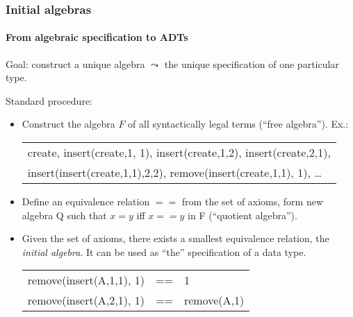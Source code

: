 \documentclass{beamer}
\begin{document}
\begin{frame}[fragile]
\frametitle{Initial algebras}
\framesubtitle{From algebraic specification to ADTs}
Goal: construct a unique algebra $\leadsto$ the unique specification of
one particular type.
\bigskip

Standard procedure:
\begin{itemize}
\item Construct the algebra $F$ of all  syntactically legal terms 
(``free algebra''). Ex.:
\\
\hspace*{0.5cm}
{\small\em
\begin{tabular}{l}
create, insert(create,1, 1), 
insert(create,1,2), insert(create,2,1),\\
insert(insert(create,1,1),2,2), remove(insert(create,1,1), 1), \ldots
\end{tabular}
}

\item Define an equivalence relation $==$ from the set of axioms, form 
new algebra Q such that $x=y$ iff $x == y $ in F (``quotient algebra'').
\item Given the set of axioms, there exists a 
smallest equiva\-lence relation, the 
\textit{initial algebra}. It can be
 used as ``the'' specification of a data type.

\hspace*{0.5cm}
{\small \em 
\begin{tabular}{lll}
remove(insert(A,1,1), 1)& == & 1\\
remove(insert(A,2,1), 1)& == &  remove(A,1)
\end{tabular}
}

\end{itemize}
\end{frame}
\end{document}
